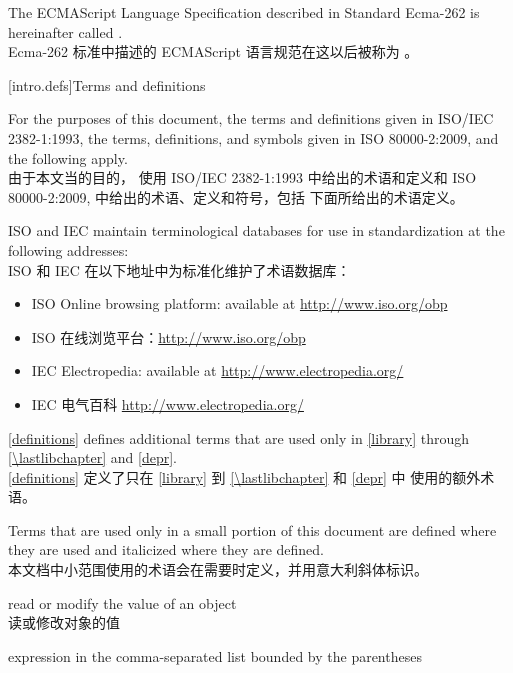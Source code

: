 \pnum
The ECMAScript Language Specification described in Standard Ecma-262 is
hereinafter called . \\
Ecma-262 标准中描述的 ECMAScript 语言规范在这以后被称为 。

[intro.defs]{Terms and definitions}

\pnum
{}%
For the purposes of this document,
the terms and definitions
given in ISO/IEC 2382-1:1993,
the terms, definitions, and symbols
given in ISO 80000-2:2009,
and the following apply. \\
由于本文当的目的，
使用 ISO/IEC 2382-1:1993 中给出的术语和定义和 
ISO 80000-2:2009, 中给出的术语、定义和符号，包括
下面所给出的术语定义。

\pnum
ISO and IEC maintain terminological databases
for use in standardization
at the following addresses:\\
ISO 和 IEC 在以下地址中为标准化维护了术语数据库：
\begin{itemize}
\item ISO Online browsing platform: available at \url{http://www.iso.org/obp}
\item ISO 在线浏览平台：\url{http://www.iso.org/obp}
\item IEC Electropedia: available at \url{http://www.electropedia.org/}
\item IEC 电气百科 \url{http://www.electropedia.org/}
\end{itemize}

\pnum
\ref{definitions}
defines additional terms that are used only in \ref{library}
through \ref{\lastlibchapter} and \ref{depr}. \\
\ref{definitions}
定义了只在 \ref{library} 到 \ref{\lastlibchapter} 和 \ref{depr} 中
使用的额外术语。

\pnum
Terms that are used only in a small portion of this document
are defined where they are used and italicized where they are
defined. \\
本文档中小范围使用的术语会在需要时定义，并用意大利斜体标识。

%
 read or modify the value of an object \\
读或修改对象的值

%
 expression in the
comma-separated list bounded by the parentheses

